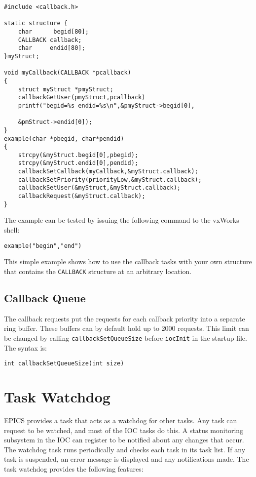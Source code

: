 \begin{verbatim}
#include <callback.h>

static structure {
    char      begid[80];
    CALLBACK callback;
    char     endid[80];
}myStruct;

void myCallback(CALLBACK *pcallback)
{
    struct myStruct *pmyStruct;
    callbackGetUser(pmyStruct,pcallback)
    printf("begid=%s endid=%s\n",&pmyStruct->begid[0],

    &pmStruct->endid[0]);
}
example(char *pbegid, char*pendid)
{
    strcpy(&myStruct.begid[0],pbegid);
    strcpy(&myStruct.endid[0],pendid);
    callbackSetCallback(myCallback,&myStruct.callback);
    callbackSetPriority(priorityLow,&myStruct.callback);
    callbackSetUser(&myStruct,&myStruct.callback);
    callbackRequest(&myStruct.callback);
}
\end{verbatim}The example can be tested by issuing the following command to the vxWorks shell:

\begin{verbatim}example("begin","end")
\end{verbatim}This simple example shows how to use the callback tasks with your own structure that contains the \verb|CALLBACK| structure 
at an arbitrary location.

\subsection{Callback Queue}

The callback requests put the requests for each callback priority into a separate ring buffer. These buffers can by default 
hold up to 2000 requests. This limit can be changed by calling \verb|callbackSetQueueSize| before \verb|iocInit| in the 
startup file. The syntax is:

\begin{verbatim}int callbackSetQueueSize(int size)
\end{verbatim}\section{Task Watchdog}

EPICS provides a task that acts as a watchdog for other tasks. Any task can request to be watched, and most of the IOC 
tasks do this. A status monitoring subsystem in the IOC can register to be notified about any changes that occur. The 
watchdog task runs periodically and checks each task in its task list. If any task is suspended, an error message is 
displayed and any notifications made. The task watchdog provides the following features:

